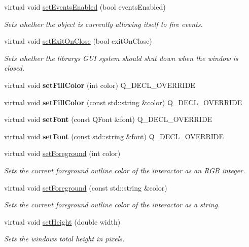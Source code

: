 \begin{DoxyCompactItemize}
\item 
virtual void \mbox{\hyperlink{classGObservable_afaa30b2a9e0f378fd1c70d2f1d0b8216}{set\+Events\+Enabled}} (bool events\+Enabled)
\begin{DoxyCompactList}\small\item\em Sets whether the object is currently allowing itself to fire events. \end{DoxyCompactList}\item 
virtual void \mbox{\hyperlink{classGWindow_abad01a63e29c19aee274af1b36209838}{set\+Exit\+On\+Close}} (bool exit\+On\+Close)
\begin{DoxyCompactList}\small\item\em Sets whether the library\textquotesingle{}s G\+UI system should shut down when the window is closed. \end{DoxyCompactList}\item 
virtual void {\bfseries set\+Fill\+Color} (int color) Q\+\_\+\+D\+E\+C\+L\+\_\+\+O\+V\+E\+R\+R\+I\+DE
\item 
virtual void {\bfseries set\+Fill\+Color} (const std\+::string \&color) Q\+\_\+\+D\+E\+C\+L\+\_\+\+O\+V\+E\+R\+R\+I\+DE
\item 
virtual void {\bfseries set\+Font} (const Q\+Font \&font) Q\+\_\+\+D\+E\+C\+L\+\_\+\+O\+V\+E\+R\+R\+I\+DE
\item 
virtual void {\bfseries set\+Font} (const std\+::string \&font) Q\+\_\+\+D\+E\+C\+L\+\_\+\+O\+V\+E\+R\+R\+I\+DE
\item 
virtual void \mbox{\hyperlink{classGDrawingSurface_a7daa57084b5811b598fce8726660b328}{set\+Foreground}} (int color)
\begin{DoxyCompactList}\small\item\em Sets the current foreground outline color of the interactor as an R\+GB integer. \end{DoxyCompactList}\item 
virtual void \mbox{\hyperlink{classGDrawingSurface_af59209aeadea6dfc6d97a2d8531f50e1}{set\+Foreground}} (const std\+::string \&color)
\begin{DoxyCompactList}\small\item\em Sets the current foreground outline color of the interactor as a string. \end{DoxyCompactList}\item 
virtual void \mbox{\hyperlink{classGWindow_a4b812426e19cdd9f6d62e7b5d90e6bec}{set\+Height}} (double width)
\begin{DoxyCompactList}\small\item\em Sets the window\textquotesingle{}s total height in pixels. \end{DoxyCompactList}\item 

\end{DoxyCompactItemize}
